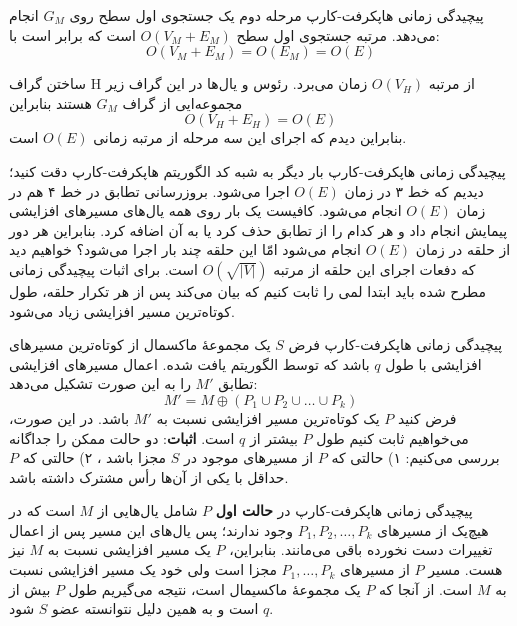 \begin{itemframe}{‌پیچیدگی زمانی هاپکرفت-کارپ}
\itm
مرحله دوم یک جستجوی اول سطح روی
$G_M$
انجام می‌دهد. مرتبه جستجوی اول سطح
$O(V_M+E_M)$
است که برابر است با:
$$O(V_M+E_M) = O(E_M) = O(E)$$

\itm
ساختن گراف H از مرتبه
$O(V_H)$
زمان می‌برد. رئوس و یال‌ها در این گراف زیر مجموعه‌ایی از گراف $G_M$ هستند بنابراین
$$O(V_H+E_H) = O(E)$$
\itm
بنابراین دیدم که اجرای این سه مرحله از مرتبه زمانی
$O(E)$
است.
\end{itemframe}

\begin{itemframe}{‌پیچیدگی زمانی هاپکرفت-کارپ}
\itm
بار دیگر به شبه کد الگوریتم هاپکرفت-کارپ دقت کنید؛ دیدیم که خط ۳ در زمان $O(E)$ اجرا می‌شود. بروزرسانی تطابق در خط ۴ هم در  زمان $O(E)$ انجام می‌شود. کافیست یک بار روی همه یال‌های مسیرهای افزایشی پیمایش انجام داد و هر کدام را از تطابق حذف کرد یا به آن اضافه کرد.
\itm
بنابراین هر دور از حلقه در زمان $O(E)$ انجام می‌شود امّا این حلقه چند بار اجرا می‌شود؟ خواهیم دید که دفعات اجرای این حلقه از مرتبه
$O(\sqrt{|V|})$
است.
\itm
برای اثبات پیچیدگی زمانی مطرح شده باید ابتدا لمی را ثابت کنیم که بیان می‌کند پس از هر تکرار حلقه، طول کوتاه‌ترین مسیر افزایشی زیاد می‌شود.
\end{itemframe}

\begin{itemframe}{‌پیچیدگی زمانی هاپکرفت-کارپ}
\itm
فرض $S$ یک مجموعهٔ ماکسمال از کوتاه‌ترین مسیرهای افزایشی با طول $q$ باشد که توسط الگوریتم یافت شده.
اعمال مسیرهای افزایشی تطابق $M'$ را به این صورت تشکیل می‌دهد:
$$
M' = M \oplus (P_1 \cup P_2 \cup \dots \cup P_k)
$$
\itm
فرض کنید $P$ یک کوتاه‌ترین مسیر افزایشی نسبت به $M'$ باشد. در این صورت، می‌خواهیم ثابت کنیم طول $P$ بیشتر از $q$ است.
\itm
\textbf{اثبات}:
 دو حالت ممکن را جداگانه بررسی می‌کنیم:
 ۱) حالتی که $P$ از مسیرهای موجود در $S$ مجزا باشد ،
 ۲) حالتی که $P$ حداقل با یکی از آن‌ها رأس مشترک داشته باشد.
\end{itemframe}

\begin{itemframe}{‌پیچیدگی زمانی هاپکرفت-کارپ}
\itm
در \textbf{حالت اول}  $P$ شامل یال‌هایی از $M$ است که در هیچ‌یک از مسیرهای $P_1, P_2, \dots, P_k$ وجود ندارند؛ پس یال‌های این مسیر پس از اعمال تغییرات دست نخورده باقی می‌مانند. بنابراین، $P$ یک مسیر افزایشی نسبت به $M$ نیز هست.
\itm
 مسیر $P$ از مسیرهای $P_1, \dots, P_k$ مجزا است ولی خود یک مسیر افزایشی نسبت به $M$ است. از آنجا که $P$ یک مجموعهٔ ماکسیمال است، نتیجه می‌گیریم طول $P$ بیش از $q$ است و به همین دلیل نتوانسته عضو $S$ شود.
\end{itemframe}

